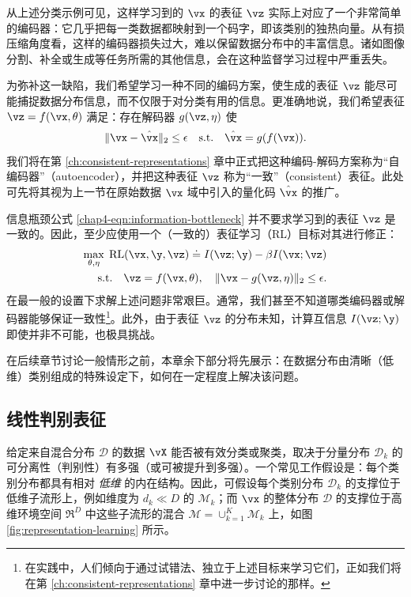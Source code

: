 \documentclass[../../book-main_zh.tex]{subfiles}
\begin{document}
从上述分类示例可见，这样学习到的 $\vx$ 的表征 $\vz$ 实际上对应了一个非常简单的编码器：它几乎把每一类数据都映射到一个码字，即该类别的独热向量。从有损压缩角度看，这样的编码器损失过大，难以保留数据分布中的丰富信息。诸如图像分割、补全或生成等任务所需的其他信息，会在这种监督学习过程中严重丢失。

为弥补这一缺陷，我们希望学习一种不同的编码方案，使生成的表征 $\vz$ 能尽可能捕捉数据分布信息，而不仅限于对分类有用的信息。更准确地说，我们希望表征 $\vz = f(\vx, \theta)$ 满足：存在解码器 $g(\vz,\eta)$ 使
\begin{equation}
    \|\vx - \hat \vx\|_2 \le \epsilon \quad \mbox{s.t.} \quad \hat{\vx}
    = g(f(\vx)).
\end{equation}
我们将在第 \ref{ch:consistent-representations} 章中正式把这种编码-解码方案称为“自编码器”（autoencoder），并把这种表征 $\vz$ 称为“一致”（consistent）表征。此处可先将其视为上一节在原始数据 $\vx$ 域中引入的量化码 $\hat \vx$ 的推广。

信息瓶颈公式 \eqref{chap4-eqn:information-bottleneck} 并不要求学习到的表征 $\vz$ 是一致的。因此，至少应使用一个（一致的）表征学习（RL）目标对其进行修正：
\begin{eqnarray}
    \max_{\theta,\eta}\; \mbox{RL}(\vx, \y, \vz) \doteq I(\vz; \y) - \beta
    I(\vx; \vz) \nonumber \\ \mathrm{s.t.}\quad  \vz = f(\vx,\theta),\quad
    \|\vx - g(\vz, \eta) \|_2 \le \epsilon.
    \label{chap4-eqn:representation-learning}
\end{eqnarray}
在最一般的设置下求解上述问题非常艰巨。通常，我们甚至不知道哪类编码器或解码器能够保证一致性\footnote{在实践中，人们倾向于通过试错法、独立于上述目标来学习它们，正如我们将在第 \ref{ch:consistent-representations} 章中进一步讨论的那样。}。此外，由于表征 $\vz$ 的分布未知，计算互信息 $I(\vz;\y)$ 即使并非不可能，也极具挑战。

在后续章节讨论一般情形之前，本章余下部分将先展示：在数据分布由清晰（低维）类别组成的特殊设定下，如何在一定程度上解决该问题。

\subsection{线性判别表征}\label{subsec:LDR}

给定来自混合分布 $\mathcal{D}$ 的数据 $\vX$ 能否被有效分类或聚类，取决于分量分布 $\mathcal{D}_k$ 的可分离性（判别性）有多强（或可被提升到多强）。一个常见工作假设是：每个类别分布都具有相对 {\em 低维} 的内在结构。因此，可假设每个类别分布 $\mathcal{D}_k$ 的支撑位于低维子流形上，例如维度为 $d_k \ll D$ 的 $\mathcal{M}_k$；而 $\vx$ 的整体分布 $\mathcal D$ 的支撑位于高维环境空间 $\Re^D$ 中这些子流形的混合 $\mathcal M = \cup_{k=1}^K \mathcal{M}_k$ 上，如图 \ref{fig:representation-learning} 所示。
\end{document}
